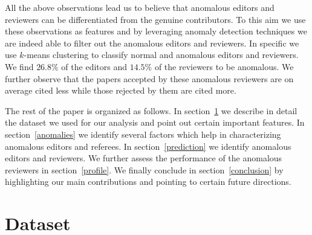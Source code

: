  All the above observations lead us to believe that anomalous editors and reviewers can be differentiated from the genuine contributors. To this aim we use these observations as features and by leveraging anomaly detection techniques we are indeed able to filter out the anomalous editors and reviewers. In specific we use $k$-means clustering \cite{hartigan1979algorithm} to classify normal and anomalous editors and reviewers.
We find $26.8\%$ of the editors and $14.5\%$ of the reviewers to be anomalous.
We further observe that the papers accepted by these anomalous reviewers are on average cited less while those rejected by them are cited more. 


 The rest of the paper is organized as follows. In section~\ref{dataset} we describe in detail the dataset we used for our analysis and point out certain important features. In section~\ref{anomalies} we identify several factors which help in characterizing anomalous editors and referees. In section~\ref{prediction} we identify anomalous editors and reviewers. 
We further assess the performance of the anomalous reviewers in section~\ref{profile}. 
We finally conclude in section~\ref{conclusion} by highlighting our main contributions and pointing to certain future directions.

%

\section{Dataset}
\label{dataset}

